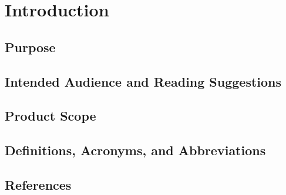 \section{Introduction}
\label{sec:introduction}

\subsection{Purpose}
\label{sec:purpose}

\subsection{Intended Audience and Reading Suggestions}
\label{sec:audience}

\subsection{Product Scope}
\label{sec:scope}

\subsection{Definitions, Acronyms, and Abbreviations}
\label{sec:definitions}

\subsection{References}
\label{sec:references}

